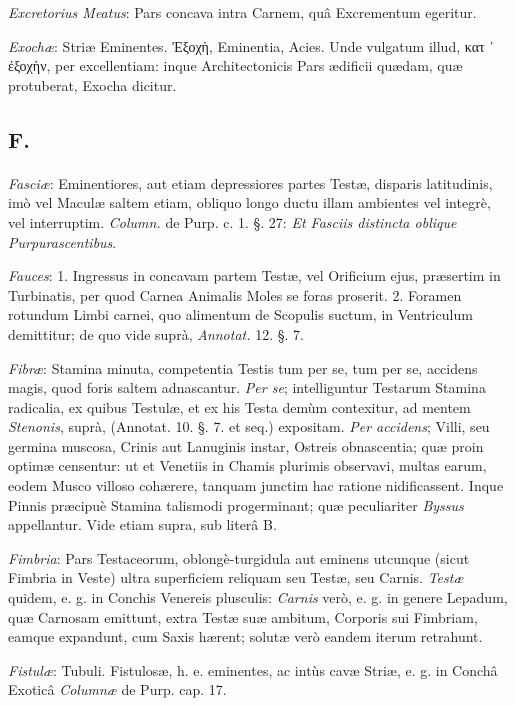 \documentclass[a4paper, 11pt, oneside, polutonikogreek, german]{article}
\begin{document}
\emph{Excretorius Meatus}: Pars concava intra Carnem, quâ Excrementum egeritur.

\emph{Exochæ}: Striæ Eminentes. Ἐξοχὴ, Eminentia, Acies. Unde vulgatum illud, κατ ᾽ ἐξοχὴν, per excellentiam: inque Architectonicis Pars ædificii quædam, quæ protuberat, Exocha dicitur.

\subsection{F.}
\paragraph{}
\emph{Fasciæ}: Eminentiores, aut etiam depressiores partes Testæ, disparis latitudinis, imò vel Maculæ saltem etiam, obliquo longo ductu illam ambientes vel integrè, vel interruptim. \emph{Column.} de Purp. c. 1. §. 27: \emph{Et Fasciis distincta oblique Purpurascentibus}.

\emph{Fauces}: 1. Ingressus in concavam partem Testæ, vel Orificium ejus, præsertim in Turbinatis, per quod Carnea Animalis Moles se foras proserit. 2. Foramen rotundum Limbi carnei, quo alimentum de Scopulis suctum, in Ventriculum demittitur; de quo vide suprà, \emph{Annotat.} 12. §. 7.

\emph{Fibræ}: Stamina minuta, competentia Testis tum per se, tum per se, accidens magis, quod foris saltem adnascantur. \emph{Per se}; intelliguntur Testarum Stamina radicalia, ex quibus Testulæ, et ex his Testa demùm contexitur, ad mentem \emph{Stenonis}, suprà, (Annotat. 10. §. 7. et seq.) expositam. \emph{Per accidens}; Villi, seu germina muscosa, Crinis aut Lanuginis instar, Ostreis obnascentia; quæ proin optimæ censentur: ut et Venetiis in Chamis plurimis observavi, multas earum, eodem Musco villoso cohærere, tanquam junctim hac ratione nidificassent. Inque Pinnis præcipuè Stamina talismodi progerminant; quæ peculiariter \emph{Byssus} appellantur. Vide etiam supra, sub literâ B.

\emph{Fimbria}: Pars Testaceorum, oblongè-turgidula aut eminens utcunque (sicut Fimbria in Veste) ultra superficiem reliquam seu Testæ, seu Carnis. \emph{Testæ} quidem, e. g. in Conchis Venereis plusculis: \emph{Carnis} verò, e. g. in genere Lepadum, quæ Carnosam emittunt, extra Testæ suæ ambitum, Corporis sui Fimbriam, eamque expandunt, cum Saxis hærent; solutæ verò eandem iterum retrahunt.

\emph{Fistulæ}: Tubuli. Fistulosæ, h. e. eminentes, ac intùs cavæ Striæ, e. g. in Conchâ Exoticâ \emph{Columnæ} de Purp. cap. 17.
\end{document}
